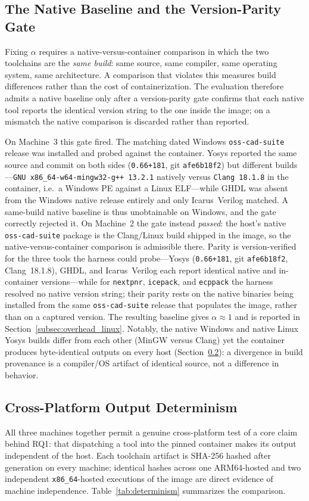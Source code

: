 \subsection{The Native Baseline and the Version-Parity Gate}
\label{subsec:native_baseline}
Fixing $\alpha$ requires a native-versus-container comparison in which the two toolchains are the \emph{same build}: same source, same compiler, same operating system, same architecture. A comparison that violates this measures build differences rather than the cost of containerization. The evaluation therefore admits a native baseline only after a version-parity gate confirms that each native tool reports the identical version string to the one inside the image; on a mismatch the native comparison is discarded rather than reported.

On Machine~3 this gate fired. The matching dated Windows \texttt{oss-cad-suite} release was installed and probed against the container. Yosys reported the same source and commit on both sides (\texttt{0.66+181}, git \texttt{afe6b18f2}) but different builds---\texttt{GNU x86\_64-w64-mingw32-g++ 13.2.1} natively versus \texttt{Clang 18.1.8} in the container, i.e.\ a Windows PE against a Linux ELF---while GHDL was absent from the Windows native release entirely and only Icarus~Verilog matched. A same-build native baseline is thus unobtainable on Windows, and the gate correctly rejected it. On Machine~2 the gate instead \emph{passed}: the host's native \texttt{oss-cad-suite} package is the Clang/Linux build shipped in the image, so the native-versus-container comparison is admissible there. Parity is version-verified for the three tools the harness could probe---Yosys (\texttt{0.66+181}, git \texttt{afe6b18f2}, Clang~18.1.8), GHDL, and Icarus~Verilog each report identical native and in-container versions---while for \texttt{nextpnr}, \texttt{icepack}, and \texttt{ecppack} the harness resolved no native version string; their parity rests on the native binaries being installed from the same \texttt{oss-cad-suite} release that populates the image, rather than on a captured version. The resulting baseline gives $\alpha \approx 1$ and is reported in Section~\ref{subsec:overhead_linux}. Notably, the native Windows and native Linux Yosys builds differ from each other (MinGW versus Clang) yet the container produces byte-identical outputs on every host (Section~\ref{subsec:determinism_results}): a divergence in build provenance is a compiler/OS artifact of identical source, not a difference in behavior.

\subsection{Cross-Platform Output Determinism}
\label{subsec:determinism_results}
All three machines together permit a genuine cross-platform test of a core claim behind RQ1: that dispatching a tool into the pinned container makes its output independent of the host. Each toolchain artifact is SHA-256 hashed after generation on every machine; identical hashes across one ARM64-hosted and two independent \texttt{x86\_64}-hosted executions of the image are direct evidence of machine independence. Table~\ref{tab:determinism} summarizes the comparison.


